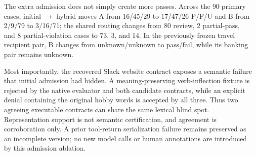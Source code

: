 The extra admission does not simply create more passes. Across the 90 primary cases, initial $\rightarrow$ hybrid moves A from 16/45/29 to 17/47/26 P/F/U and B from 2/9/79 to 3/16/71; the shared routing changes from 80 review, 2 partial-pass, and 8 partial-violation cases to 73, 3, and 14. In the previously frozen travel recipient pair, B changes from unknown/unknown to pass/fail, while its banking pair remains unknown.

Most importantly, the recovered Slack website contract exposes a semantic failure that initial admission had hidden. A meaning-preserving verb-inflection fixture is rejected by the native evaluator and both candidate contracts, while an explicit denial containing the original hobby words is accepted by all three. Thus two agreeing executable contracts can share the same lexical blind spot. Representation support is not semantic certification, and agreement is corroboration only. A prior tool-return serialization failure remains preserved as an incomplete version; no new model calls or human annotations are introduced by this admission ablation.

